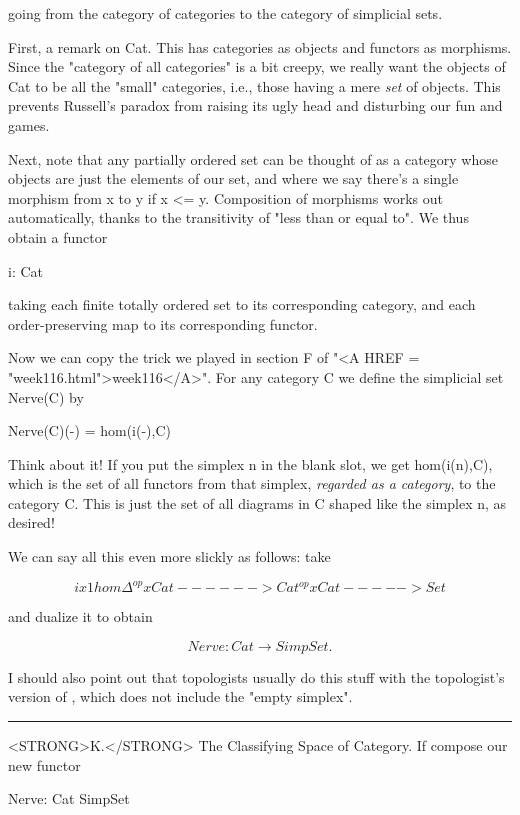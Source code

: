 going from the category of categories to the category of simplicial
sets.  

First, a remark on Cat.  This has categories as objects and functors
as morphisms.  Since the "category of all categories" is a bit
creepy, we really want the objects of Cat to be all the "small" 
categories, i.e., those having a mere \emph{set} of objects.  This 
prevents Russell's paradox from raising its ugly head and disturbing
our fun and games.  

Next, note that any partially ordered set can be thought of as a
category whose objects are just the elements of our set, and where we
say there's a single morphism from x to y if x <= y.  Composition of
morphisms works out automatically, thanks to the transitivity of "less
than or equal to".  We thus obtain a functor

i: \Delta  \to  Cat

taking each finite totally ordered set to its corresponding category,
and each order-preserving map to its corresponding functor.

Now we can copy the trick we played in section F of "<A HREF = "week116.html">week116</A>".  For any
category C we define the simplicial set Nerve(C) by

                 Nerve(C)(-) = hom(i(-),C) 

Think about it!  If you put the simplex n in the blank slot, we
get hom(i(n),C), which is the set of all functors from that simplex,
\emph{regarded as a category}, to the category C.  This is just the
set of all diagrams in C shaped like the simplex n, as desired!

We can say all this even more slickly as follows: take

$$
                               i x 1                  hom
                 \Delta ^{op} x Cat ------> Cat^{op} x Cat -----> Set
$$
    
and dualize it to obtain

$$
                 Nerve: Cat \to  SimpSet.
$$
    
I should also point out that topologists usually do this stuff with
the topologist's version of \Delta , which does not include the "empty
simplex".  

\par\noindent\rule{\textwidth}{0.4pt}
<STRONG>K.</STRONG>  The Classifying Space of Category.  
If compose our new functor

                Nerve: Cat \to  SimpSet


